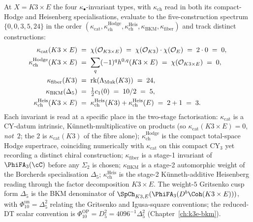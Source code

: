 \begin{remark}
\label{rem:v3-intro-kappa-quadruple}
At $X = K3\times E$ the four $\kappa_\bullet$-invariant types,
with $\kappa_{\mathrm{ch}}$ read in both its compact-Hodge and
Heisenberg specialisations, evaluate to the five-construction
spectrum $\{0, 0, 3, 5, 24\}$ in the order
$(\kappa_{\mathrm{cat}}, \kappa_{\mathrm{ch}}^{\mathrm{Hodge}},
\kappa_{\mathrm{ch}}^{\mathrm{Heis}},
\kappa_{\mathrm{BKM}}, \kappa_{\mathrm{fiber}})$ and track
distinct constructions:
\[
\begin{aligned}
 \kappa_{\mathrm{cat}}(K3\times E)
 &\;=\; \chi(\mathcal{O}_{K3\times E})
 \;=\; \chi(\mathcal{O}_{K3}) \cdot \chi(\mathcal{O}_E)
 \;=\; 2 \cdot 0 \;=\; 0, \\
 \kappa_{\mathrm{ch}}^{\mathrm{Hodge}}(K3\times E)
 &\;=\; \sum_q (-1)^q h^{0,q}(K3\times E)
 \;=\; \chi(\mathcal{O}_{K3\times E}) \;=\; 0, \\
 \kappa_{\mathrm{fiber}}(K3)
 &\;=\; \mathrm{rk}(\Lambda_{\mathrm{Muk}}(K3))
 \;=\; 24, \\
 \kappa_{\mathrm{BKM}}(\Delta_5)
 &\;=\; \tfrac{1}{2}c_1(0)
 \;=\; 10/2
 \;=\; 5, \\
 \kappa_{\mathrm{ch}}^{\mathrm{Heis}}(K3\times E)
 &\;=\; \kappa_{\mathrm{ch}}^{\mathrm{Heis}}(K3)
 + \kappa_{\mathrm{ch}}^{\mathrm{Heis}}(E)
 \;=\; 2 + 1 \;=\; 3.
\end{aligned}
\]
Each invariant is read at a specific place in the two-stage
factorisation: $\kappa_{\mathrm{cat}}$ is a CY-datum intrinsic,
K\"unneth-multiplicative on products (so
$\kappa_{\mathrm{cat}}(K3\times E) = 0$, \emph{not}~$2$; the $2$
is $\kappa_{\mathrm{cat}}(K3)$ of the fibre alone);
$\kappa_{\mathrm{ch}}^{\mathrm{Hodge}}$ is the compact total-space
Hodge supertrace, coinciding numerically with $\kappa_{\mathrm{cat}}$
on this compact CY$_3$ yet recording a distinct chiral construction;
$\kappa_{\mathrm{fiber}}$ is a stage-1 invariant of
$\PhiFA_3(\cC)$ before any $\Sigma_2$ is chosen;
$\kappa_{\mathrm{BKM}}$ is a stage-2 automorphic weight of the
Borcherds specialisation $\Delta_5$; $\kappa_{\mathrm{ch}}^{\mathrm{Heis}}$
is the stage-2 K\"unneth-additive Heisenberg reading through the
factor decomposition $K3 \times E$. The weight-$5$ Gritsenko cusp
form $\Delta_5$ is the BKM denominator of
$\SpCh_{K3, E}(\PhiFA_3(D^b\Coh(K3\times E)))$, with
\(\Phi_{10}^{\mathrm{un}}=\Delta_5^2\) relating the Gritsenko and
Igusa-square conventions; the reduced-DT scalar convention is
\(\Phi_{10}^{\mathrm{OP}}=D_5^2=4096^{-1}\Delta_5^2\)
(Chapter~\ref{ch:k3e-bkm}).
\end{remark}

